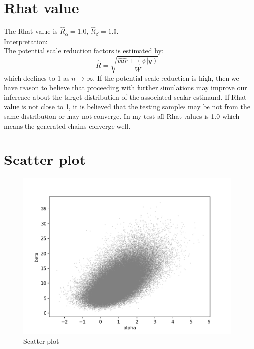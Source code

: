 \documentclass{article}
\begin{document}
\section{Rhat value}

The Rhat value is $\hat{R}_\alpha=1.0$, $\hat{R}_\beta=1.0$.\\

Interpretation: \\
The potential scale reduction factors is estimated by:
\begin{equation}
\hat{R}=\sqrt{\frac{\hat{var}+(\psi|y)}{W}}
\end{equation}
which declines to 1 as $n\rightarrow \infty$. If the potential scale reduction is high, then we have reason to believe that proceeding with further simulations may improve our inference about the target distribution of the associated scalar estimand. If Rhat-value is not close to 1, it is believed that the testing samples may be not from the same distribution or may not converge. In my test all Rhat-values is 1.0 which means the generated chains converge well.\\

\section{Scatter plot}
\begin{figure}[H]
\centering  
\includegraphics[scale=0.5]{scatter.png}
\caption{Scatter plot}
\label{fig: label}
\end{figure}



\appendix
\end{document}
